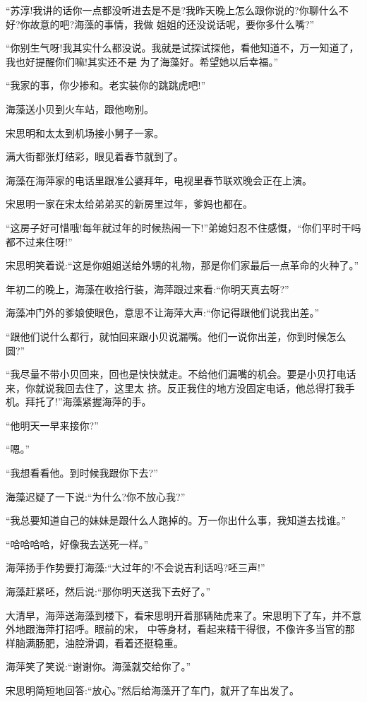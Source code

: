 \documentclass[11pt,a4paper,onecolumn]{article}
\begin{document}
``苏淳!我讲的话你一点都没听进去是不是?我昨天晚上怎么跟你说的?你聊什么不好?你故意的吧?海藻的事情，我做
姐姐的还没说话呢，要你多什么嘴?''

``你别生气呀!我其实什么都没说。我就是试探试探他，看他知道不，万一知道了，我也好提醒你们嘛!其实还不是
为了海藻好。希望她以后幸福。''

``我家的事，你少掺和。老实装你的跳跳虎吧!''

海藻送小贝到火车站，跟他吻别。

宋思明和太太到机场接小舅子一家。

满大街都张灯结彩，眼见着春节就到了。

海藻在海萍家的电话里跟准公婆拜年，电视里春节联欢晚会正在上演。

宋思明一家在宋太给弟弟买的新房里过年，爹妈也都在。

``这房子好可惜哦!每年就过年的时候热闹一下!''弟媳妇忍不住感慨，``你们平时干吗都不过来住呀!''

宋思明笑着说:``这是你姐姐送给外甥的礼物，那是你们家最后一点革命的火种了。''

年初二的晚上，海藻在收拾行装，海萍跟过来看:``你明天真去呀?''

海藻冲门外的爹娘使眼色，意思不让海萍大声:``你记得跟他们说我出差。''

``跟他们说什么都行，就怕回来跟小贝说漏嘴。他们一说你出差，你到时候怎么圆?''

``我尽量不带小贝回来，回也是快快就走。不给他们漏嘴的机会。要是小贝打电话来，你就说我回去住了，这里太
挤。反正我住的地方没固定电话，他总得打我手机。拜托了!''海藻紧握海萍的手。

``他明天一早来接你?''

``嗯。''

``我想看看他。到时候我跟你下去?''

海藻迟疑了一下说:``为什么?你不放心我?''

``我总要知道自己的妹妹是跟什么人跑掉的。万一你出什么事，我知道去找谁。''

``哈哈哈哈，好像我去送死一样。''

海萍扬手作势要打海藻:``大过年的!不会说吉利话吗?呸三声!''

海藻赶紧呸，然后说:``那你明天送我下去好了。''

大清早，海萍送海藻到楼下，看宋思明开着那辆陆虎来了。宋思明下了车，并不意外地跟海萍打招呼。眼前的宋，
中等身材，看起来精干得很，不像许多当官的那样脑满肠肥，油腔滑调，看着还挺稳重。

海萍笑了笑说:``谢谢你。海藻就交给你了。''

宋思明简短地回答:``放心。''然后给海藻开了车门，就开了车出发了。
\end{document}
